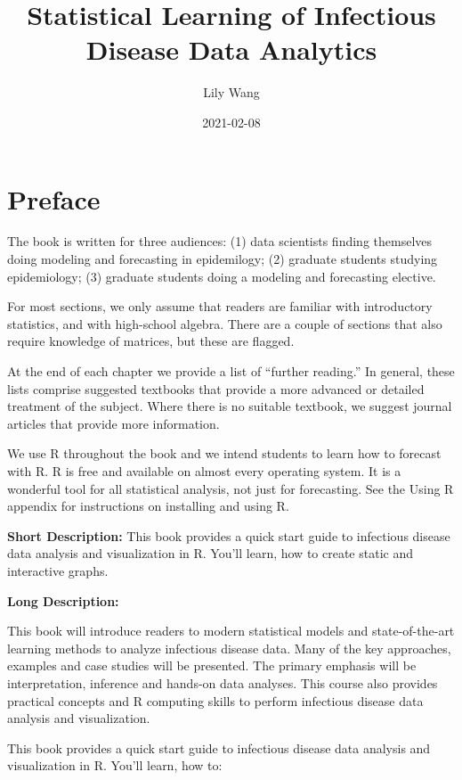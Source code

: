 \documentclass[]{book}
\title{Statistical Learning of Infectious Disease Data Analytics}
\author{Lily Wang}
\date{2021-02-08}
\begin{document}
\maketitle

{
\setcounter{tocdepth}{1}
\tableofcontents
}
\chapter{Preface}\label{preface}

The book is written for three audiences: (1) data scientists finding
themselves doing modeling and forecasting in epidemilogy; (2) graduate
students studying epidemiology; (3) graduate students doing a modeling
and forecasting elective.

For most sections, we only assume that readers are familiar with
introductory statistics, and with high-school algebra. There are a
couple of sections that also require knowledge of matrices, but these
are flagged.

At the end of each chapter we provide a list of ``further reading.'' In
general, these lists comprise suggested textbooks that provide a more
advanced or detailed treatment of the subject. Where there is no
suitable textbook, we suggest journal articles that provide more
information.

We use R throughout the book and we intend students to learn how to
forecast with R. R is free and available on almost every operating
system. It is a wonderful tool for all statistical analysis, not just
for forecasting. See the Using R appendix for instructions on installing
and using R.

\textbf{Short Description:} This book provides a quick start guide to
infectious disease data analysis and visualization in R. You'll learn,
how to create static and interactive graphs.

\textbf{Long Description:}

This book will introduce readers to modern statistical models and
state-of-the-art learning methods to analyze infectious disease data.
Many of the key approaches, examples and case studies will be presented.
The primary emphasis will be interpretation, inference and hands-on data
analyses. This course also provides practical concepts and R computing
skills to perform infectious disease data analysis and visualization.

This book provides a quick start guide to infectious disease data
analysis and visualization in R. You'll learn, how to:
\end{document}
